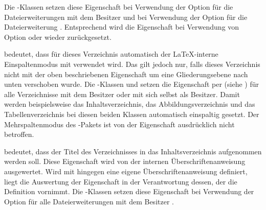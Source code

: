 \begin{description}
  Die \KOMAScript-Klassen setzen diese Eigenschaft bei Verwendung der Option
   für die Dateierweiterungen mit
  dem Besitzer  und bei Verwendung der Option
   für die Dateierweiterung
  . Entsprechend
  wird die Eigenschaft bei Verwendung von Option
   oder
   wieder zurückgesetzt.
\item[\PValue{onecolumn}] \leavevmode{}%
  bedeutet, dass für dieses Verzeichnis automatisch der \LaTeX-interne
  Einspaltenmodus mit  verwendet
  wird. Das gilt jedoch nur, falls dieses Verzeichnis
  nicht mit der oben beschriebenen Eigenschaft
   um eine Gliederungsebene
  nach unten verschoben wurde. Die \KOMAScript-Klassen  und
   setzen die Eigenschaft per
   (siehe
  ) für alle Verzeichnisse mit dem
  Besitzer  oder mit sich selbst als Besitzer. Damit werden
  beispielsweise das Inhaltsverzeichnis, das Abbildungsverzeichnis und das
  Tabellenverzeichnis bei diesen beiden Klassen automatisch einspaltig
  gesetzt. Der Mehrspaltenmodus des
  -Pakets ist von der Eigenschaft
  ausdrücklich nicht betroffen.
\item[\PValue{totoc}] bedeutet, dass der Titel des Verzeichnisses in das
  Inhaltsverzeichnis aufgenommen werden soll. Diese Eigenschaft wird von der
  internen Überschriftenanweisung ausgewertet. Wird mit
   hingegen eine eigene Überschriftenanweisung
  definiert, liegt die Auswertung der Eigenschaft in der Verantwortung dessen,
  der die Definition vornimmt. Die \KOMAScript-Klassen setzen diese
  Eigenschaft bei Verwendung der Option
   für alle Dateierweiterungen mit dem
  Besitzer .
\end{description}
